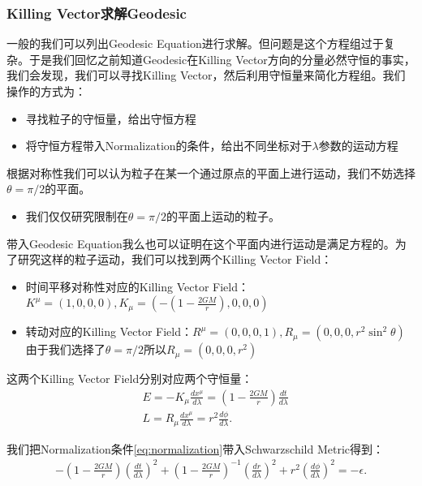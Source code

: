 \subsubsection{Killing Vector求解Geodesic}

一般的我们可以列出Geodesic
Equation进行求解。但问题是这个方程组过于复杂。于是我们回忆之前知道Geodesic在Killing
Vector方向的分量必然守恒的事实，我们会发现，我们可以寻找Killing Vector，然后利用守恒量来简化方程组。我们操作的方式为：
\begin{itemize}
  \item 寻找粒子的守恒量，给出守恒方程
  \item 将守恒方程带入Normalization的条件，给出不同坐标对于$ \lambda $参数的运动方程
\end{itemize}

\bigskip
{}

根据对称性我们可以认为粒子在某一个通过原点的平面上进行运动，我们不妨选择$ \theta = \pi/2 $的平面。
\begin{itemize}
  \item 我们仅仅研究限制在$ \theta = \pi /2 $的平面上运动的粒子。
\end{itemize}
带入Geodesic
Equation我么也可以证明在这个平面内进行运动是满足方程的。为了研究这样的粒子运动，我们可以找到两个Killing Vector Field：
\begin{itemize}
  \item 时间平移对称性对应的Killing Vector Field：$ K^\mu = (1,0,0,0) ,
    K_\mu=\left(-\left(1-\frac{2GM}{r}\right),0,0,0\right)$
  \item 转动对应的Killing Vector Field：$ R^\mu = (0,0,0,1) ,
    R_\mu=\left(0,0,0,r^2\sin^2\theta\right) $由于我们选择了$ \theta = \pi/2
    $所以$ R_\mu = (0,0,0,r^2) $
\end{itemize}
这两个Killing Vector Field分别对应两个守恒量：
\begin{align}\label{eq:conservedquantities}
  &E=-K_\mu\frac{dx^\mu}{d\lambda}=\left(1-\frac{2GM}{r}\right)\frac{dt}{d\lambda}\\
  &L=R_\mu\frac{dx^\mu}{d\lambda}=r^2\frac{d\phi}{d\lambda}.
\end{align}

\bigskip
{}

我们把Normalization条件\cref{eq:normalization}带入Schwarzschild Metric得到：
\begin{align}
  -\left(1-\frac{2GM}{r}\right)\left(\frac{dt}{d\lambda}\right)^2+\left(1-\frac{2GM}{r}\right)^{-1}\left(\frac{dr}{d\lambda}\right)^2+r^2\left(\frac{d\phi}{d\lambda}\right)^2=-\epsilon.
\end{align}

